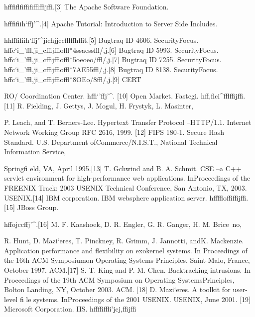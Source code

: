 h\Sigma \Sigma \Upsilon \Phi \Psi \Psi \Omega \Omega \Omega fffiflfiffififflffijffi.[3] The Apache Software Foundation.

h\Sigma \Sigma \Upsilon \Phi \Psi \Psi \Omega \Omega \Omega fffi\Upsilon fiih`ffj'^.[4] Apache Tutorial: Introduction to Server Side Includes.

h\Sigma \Sigma \Upsilon \Phi \Psi \Psi h\Sigma \Sigma \Upsilon *fffi\Upsilon fiih`ffj'^\Psi *jic\Psi hj\Omega \Sigma j\Psi ccfflffh\Sigma ffit.[5] Bugtraq ID 4606. SecurityFocus.
h\Sigma \Sigma \Upsilon \Phi \Psi \Psi \Omega \Omega \Omega ffc`i_'ffl\Sigma *,ji_cffijffi\Psi offl*\Psi 4ssaess\Psi ffl/,j\Psi .[6] Bugtraq ID 5993. SecurityFocus.
h\Sigma \Sigma \Upsilon \Phi \Psi \Psi \Omega \Omega \Omega ffc`i_'ffl\Sigma *,ji_cffijffi\Psi offl*\Psi 5oeoeo/\Psi ffl/,j\Psi .[7] Bugtraq ID 7255. SecurityFocus.
h\Sigma \Sigma \Upsilon \Phi \Psi \Psi \Omega \Omega \Omega ffc`i_'ffl\Sigma *,ji_cffijffi\Psi offl*\Psi 7AE55\Psi ffl/,j\Psi .[8] Bugtraq ID 8138. SecurityFocus.
h\Sigma \Sigma \Upsilon \Phi \Psi \Psi \Omega \Omega \Omega ffc`i_'ffl\Sigma *,ji_cffijffi\Psi offl*\Psi 8OEo/8\Psi ffl/,j\Psi .[9] CERT

RO/ Coordination Center. h\Sigma \Sigma \Upsilon \Phi \Psi \Psi \Omega \Omega \Omega ffi`'\Sigma ffj'^.
[10] Open Market. Fastcgi. h\Sigma \Sigma \Upsilon \Phi \Psi \Psi \Omega \Omega \Omega ff,fic\Sigma i^fflffijffi.[11] R. Fielding, J. Gettys, J. Mogul, H. Frystyk, L. Masinter,

P. Leach, and T. Berners-Lee. Hypertext Transfer Protocol --HTTP/1.1. Internet Network Working Group RFC 2616, 1999.
[12] FIPS 180-1. Secure Hash Standard. U.S. Department ofCommerce/N.I.S.T., National Technical Information Service,

Springfi eld, VA, April 1995.[13] T. Gchwind and B. A. Schmit. CSE --a C++ servlet
environment for high-performance web applications. InProceedings of the FREENIX Track: 2003 USENIX Technical
Conference, San Antonio, TX, 2003. USENIX.[14] IBM corporation. IBM websphere application server.
h\Sigma \Sigma \Upsilon \Phi \Psi \Psi \Omega \Omega \Omega ffffloffiffijffi.[15] JBoss Group.

h\Sigma \Sigma \Upsilon \Phi \Psi \Psi \Omega \Omega \Omega ffojccffj'^.[16] M. F. Kaashoek, D. R. Engler, G. R. Ganger, H. M. Brice~no,

R. Hunt, D. Mazi`eres, T. Pinckney, R. Grimm, J. Jannotti, andK. Mackenzie. Application performance and flexibility on
exokernel systems. In Proceedings of the 16th ACM Symposiumon Operating Systems Principles, Saint-Malo, France, October
1997. ACM.[17] S. T. King and P. M. Chen. Backtracking intrusions. In
Proceedings of the 19th ACM Symposium on Operating SystemsPrinciples, Bolton Landing, NY, October 2003. ACM.
[18] D. Mazi`eres. A toolkit for user-level fi le systems. InProceedings of the 2001 USENIX. USENIX, June 2001.
[19] Microsoft Corporation. IIS. h\Sigma \Sigma \Upsilon \Phi \Psi \Psi \Omega \Omega \Omega ffffiffli'jcj,\Sigma ffijffi\Psi 

